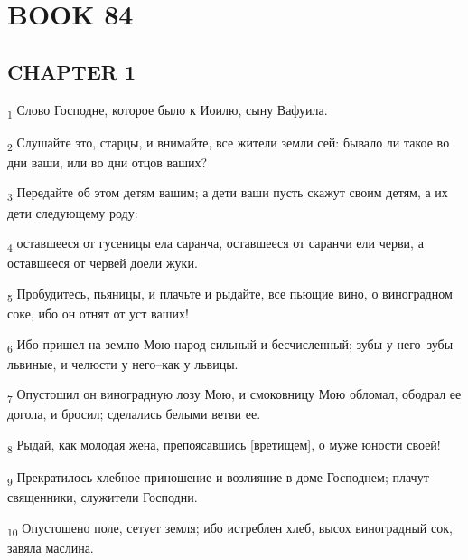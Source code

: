 \section{BOOK 84}
\subsection{CHAPTER 1}
\begin{tcolorbox}
\textsubscript{1} Слово Господне, которое было к Иоилю, сыну Вафуила.
\end{tcolorbox}
\begin{tcolorbox}
\textsubscript{2} Слушайте это, старцы, и внимайте, все жители земли сей: бывало ли такое во дни ваши, или во дни отцов ваших?
\end{tcolorbox}
\begin{tcolorbox}
\textsubscript{3} Передайте об этом детям вашим; а дети ваши пусть скажут своим детям, а их дети следующему роду:
\end{tcolorbox}
\begin{tcolorbox}
\textsubscript{4} оставшееся от гусеницы ела саранча, оставшееся от саранчи ели черви, а оставшееся от червей доели жуки.
\end{tcolorbox}
\begin{tcolorbox}
\textsubscript{5} Пробудитесь, пьяницы, и плачьте и рыдайте, все пьющие вино, о виноградном соке, ибо он отнят от уст ваших!
\end{tcolorbox}
\begin{tcolorbox}
\textsubscript{6} Ибо пришел на землю Мою народ сильный и бесчисленный; зубы у него--зубы львиные, и челюсти у него--как у львицы.
\end{tcolorbox}
\begin{tcolorbox}
\textsubscript{7} Опустошил он виноградную лозу Мою, и смоковницу Мою обломал, ободрал ее догола, и бросил; сделались белыми ветви ее.
\end{tcolorbox}
\begin{tcolorbox}
\textsubscript{8} Рыдай, как молодая жена, препоясавшись [вретищем], о муже юности своей!
\end{tcolorbox}
\begin{tcolorbox}
\textsubscript{9} Прекратилось хлебное приношение и возлияние в доме Господнем; плачут священники, служители Господни.
\end{tcolorbox}
\begin{tcolorbox}
\textsubscript{10} Опустошено поле, сетует земля; ибо истреблен хлеб, высох виноградный сок, завяла маслина.
\end{tcolorbox}
